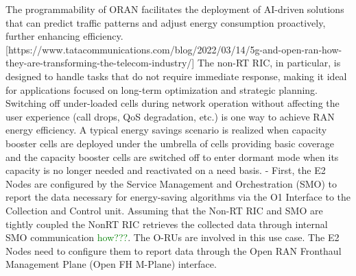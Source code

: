 The programmability of ORAN facilitates the deployment of AI-driven solutions that can predict traffic patterns and adjust energy consumption proactively, further enhancing efficiency. [https://www.tatacommunications.com/blog/2022/03/14/5g-and-open-ran-how-they-are-transforming-the-telecom-industry/]
The non-RT RIC, in particular, is designed to handle tasks that do not require immediate response, making it ideal for applications focused on long-term optimization and strategic planning.
Switching off under-loaded cells during network operation without affecting the user experience (call drops, QoS degradation, etc.) is one way to achieve RAN energy efficiency. A typical energy savings scenario is realized when capacity booster cells are deployed under the umbrella of cells providing basic coverage and the capacity booster cells are switched off to enter dormant mode when its capacity is no longer needed and reactivated on a need basis. - First, the E2 Nodes are configured by the Service Management and Orchestration (SMO) to report the data necessary for energy-saving algorithms via the O1 Interface to the Collection and Control unit. Assuming that the Non-RT RIC and SMO are tightly coupled the NonRT RIC retrieves the collected data through internal SMO communication \textcolor{green}{how???}. The O-RUs are involved in this use case. The E2 Nodes need to configure them to report data through the Open RAN Fronthaul Management Plane (Open FH M-Plane) interface.\\
